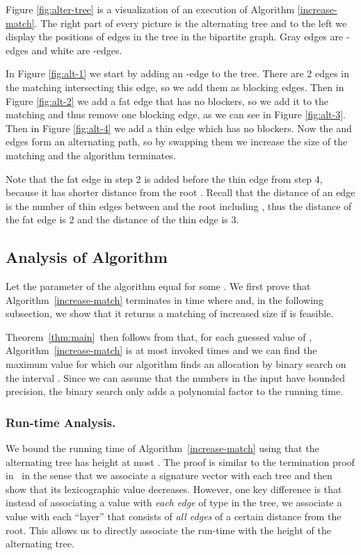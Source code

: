 \documentclass{llncs}
\begin{document}
Figure \ref{fig:alter-tree} is a visualization of an execution of Algorithm
\ref{increase-match}. The right part of every picture is the alternating tree
and to the left we display the positions of edges in the tree in the bipartite
graph.  Gray edges are -edges and white are -edges.

In Figure \ref{fig:alt-1} we start by adding an -edge to the tree. There are
2 edges in the matching intersecting this edge, so we add them as blocking
edges. Then in Figure \ref{fig:alt-2} we add a fat edge that has no blockers, so
we add it to the matching and thus remove one blocking edge, as we can see in
Figure \ref{fig:alt-3}. Then in Figure \ref{fig:alt-4} we add a thin edge which
has no blockers. Now the  and  edges form an alternating path, so by
swapping them we increase the size of the matching and the algorithm terminates.

Note that the fat edge in step 2 is added before the thin edge from step 4,
because it has shorter distance from the root . Recall that the distance of
an edge  is the number of thin edges between  and the root including ,
thus the distance of the fat edge is 2 and the distance of the thin edge is 3.

\subsection{Analysis of Algorithm}

\label{sec:algoanal}

Let the parameter  of the algorithm equal  for some
. We first prove that Algorithm~\ref{increase-match} terminates in
time  where 
and, in the following subsection, we show that it returns a matching of
increased size if  is feasible.

Theorem~\ref{thm:main}~then follows from that, for each guessed value of ,
Algorithm~\ref{increase-match} is at most invoked  times and we can find the
maximum value  for which our algorithm finds an allocation by binary search
on the interval . Since we can assume that the numbers in the
input have bounded precision, the binary search only adds a polynomial factor to
the running time.

\subsubsection{Run-time Analysis.}
We bound the running time of Algorithm~\ref{increase-match} using that
the alternating tree has height at most
. The proof is similar to the termination proof
in~\cite{AFS08} in the sense that we associate a signature vector with
each tree and then show that its lexicographic value
decreases. However, one key difference is that instead of associating a
value with \emph{each edge} of type  in the tree, we associate a
value with each ``layer'' that consists of \emph{all edges} of a certain
distance from the root. This allows us to directly associate the
run-time with the height of the alternating tree.
\end{document}
